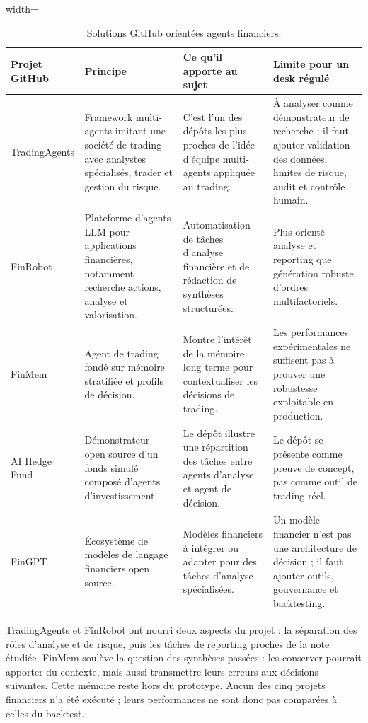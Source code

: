 \begin{table}[H]
\centering
\caption{Solutions GitHub orientées agents financiers.}
\label{tab:github-finance-agents}
\scriptsize
\begin{adjustbox}{width=\textwidth}
\begin{tabular}{p{}p{}p{}p{}}
\toprule
\textbf{Projet GitHub} & \textbf{Principe} & \textbf{Ce qu'il apporte au sujet} & \textbf{Limite pour un desk régulé} \\
\midrule
TradingAgents \citep{githubTradingAgents} & Framework multi-agents imitant une société de trading avec analystes spécialisés, trader et gestion du risque. & C'est l'un des dépôts les plus proches de l'idée d'équipe multi-agents appliquée au trading. & À analyser comme démonstrateur de recherche ; il faut ajouter validation des données, limites de risque, audit et contrôle humain. \\
FinRobot \citep{githubFinRobot} & Plateforme d'agents LLM pour applications financières, notamment recherche actions, analyse et valorisation. & Automatisation de tâches d'analyse financière et de rédaction de synthèses structurées. & Plus orienté analyse et reporting que génération robuste d'ordres multifactoriels. \\
FinMem \citep{finmem2023,githubFinMem} & Agent de trading fondé sur mémoire stratifiée et profils de décision. & Montre l'intérêt de la mémoire long terme pour contextualiser les décisions de trading. & Les performances expérimentales ne suffisent pas à prouver une robustesse exploitable en production. \\
AI Hedge Fund \citep{githubAiHedgeFund} & Démonstrateur open source d'un fonds simulé composé d'agents d'investissement. & Le dépôt illustre une répartition des tâches entre agents d'analyse et agent de décision. & Le dépôt se présente comme preuve de concept, pas comme outil de trading réel. \\
FinGPT \citep{fingpt2023,githubFinGPT} & Écosystème de modèles de langage financiers open source. & Modèles financiers à intégrer ou adapter pour des tâches d'analyse spécialisées. & Un modèle financier n'est pas une architecture de décision ; il faut ajouter outils, gouvernance et backtesting. \\
\bottomrule
\end{tabular}
\end{adjustbox}
\end{table}

TradingAgents et FinRobot ont nourri deux aspects du projet : la séparation des rôles d'analyse et de risque, puis les tâches de reporting proches de la note étudiée. FinMem soulève la question des synthèses passées : les conserver pourrait apporter du contexte, mais aussi transmettre leurs erreurs aux décisions suivantes. Cette mémoire reste hors du prototype. Aucun des cinq projets financiers n'a été exécuté ; leurs performances ne sont donc pas comparées à celles du backtest.

